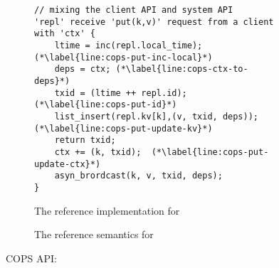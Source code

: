 \begin{figure}
\begin{subfigure}{\textwidth}
\begin{lstlisting}
// mixing the client API and system API
'repl' receive 'put(k,v)' request from a client with 'ctx' {
    ltime = inc(repl.local_time);(*\label{line:cops-put-inc-local}*) 
    deps = ctx; (*\label{line:cops-ctx-to-deps}*) 
    txid = (ltime ++ repl.id); (*\label{line:cops-put-id}*)
    list_insert(repl.kv[k],(v, txid, deps)); (*\label{line:cops-put-update-kv}*)
    return txid;
    ctx += (k, txid);  (*\label{line:cops-put-update-ctx}*) 
    asyn_brordcast(k, v, txid, deps); 
}
\end{lstlisting}
\caption{The reference implementation for \pcopsput}
\label{lst:cops-put}
\end{subfigure}

\hrulefill

\begin{subfigure}{\textwidth}
\begin{mathpar}
\end{mathpar}

\caption{The reference semantics for \pcopsput}
\label{fig:cops-semantics-write}
\end{subfigure}

\hrulefill

\caption{COPS API: \pcopsput}

\end{figure}
